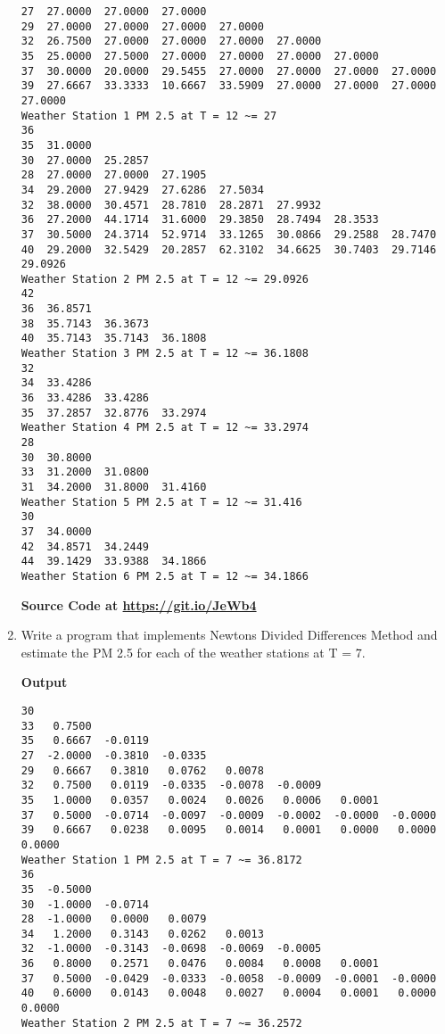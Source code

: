 \documentclass{exam}
\begin{document}
\begin{enumerate}
\begin{verbatim}
27  27.0000  27.0000  27.0000
29  27.0000  27.0000  27.0000  27.0000
32  26.7500  27.0000  27.0000  27.0000  27.0000
35  25.0000  27.5000  27.0000  27.0000  27.0000  27.0000
37  30.0000  20.0000  29.5455  27.0000  27.0000  27.0000  27.0000
39  27.6667  33.3333  10.6667  33.5909  27.0000  27.0000  27.0000  27.0000
Weather Station 1 PM 2.5 at T = 12 ~= 27
36
35  31.0000
30  27.0000  25.2857
28  27.0000  27.0000  27.1905
34  29.2000  27.9429  27.6286  27.5034
32  38.0000  30.4571  28.7810  28.2871  27.9932
36  27.2000  44.1714  31.6000  29.3850  28.7494  28.3533
37  30.5000  24.3714  52.9714  33.1265  30.0866  29.2588  28.7470
40  29.2000  32.5429  20.2857  62.3102  34.6625  30.7403  29.7146  29.0926
Weather Station 2 PM 2.5 at T = 12 ~= 29.0926
42
36  36.8571
38  35.7143  36.3673
40  35.7143  35.7143  36.1808
Weather Station 3 PM 2.5 at T = 12 ~= 36.1808
32
34  33.4286
36  33.4286  33.4286
35  37.2857  32.8776  33.2974
Weather Station 4 PM 2.5 at T = 12 ~= 33.2974
28
30  30.8000
33  31.2000  31.0800
31  34.2000  31.8000  31.4160
Weather Station 5 PM 2.5 at T = 12 ~= 31.416
30
37  34.0000
42  34.8571  34.2449
44  39.1429  33.9388  34.1866
Weather Station 6 PM 2.5 at T = 12 ~= 34.1866
    \end{verbatim}
    \begin{center}
        \textbf{Source Code at \url{https://git.io/JeWb4}}
    \end{center}
	\newpage
	\item  Write  a  program  that  implements  Newtons  Divided  Differences  Method  and estimate the PM 2.5 for each of the weather stations at T = 7.
    \begin{center}
        \textbf{Output}
    \end{center}
    \begin{verbatim}
30
33   0.7500
35   0.6667  -0.0119
27  -2.0000  -0.3810  -0.0335
29   0.6667   0.3810   0.0762   0.0078
32   0.7500   0.0119  -0.0335  -0.0078  -0.0009
35   1.0000   0.0357   0.0024   0.0026   0.0006   0.0001
37   0.5000  -0.0714  -0.0097  -0.0009  -0.0002  -0.0000  -0.0000
39   0.6667   0.0238   0.0095   0.0014   0.0001   0.0000   0.0000   0.0000
Weather Station 1 PM 2.5 at T = 7 ~= 36.8172
36
35  -0.5000
30  -1.0000  -0.0714
28  -1.0000   0.0000   0.0079
34   1.2000   0.3143   0.0262   0.0013
32  -1.0000  -0.3143  -0.0698  -0.0069  -0.0005
36   0.8000   0.2571   0.0476   0.0084   0.0008   0.0001
37   0.5000  -0.0429  -0.0333  -0.0058  -0.0009  -0.0001  -0.0000
40   0.6000   0.0143   0.0048   0.0027   0.0004   0.0001   0.0000   0.0000
Weather Station 2 PM 2.5 at T = 7 ~= 36.2572

\end{verbatim}
\end{enumerate}
\end{document}
